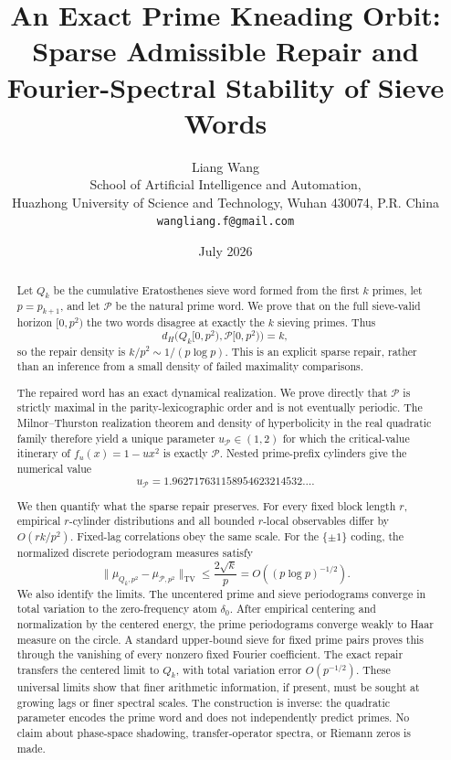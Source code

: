 \documentclass[11pt]{article}
\title{\textbf{An Exact Prime Kneading Orbit:}\\
Sparse Admissible Repair and Fourier-Spectral Stability of Sieve Words}
\author{Liang Wang\\
\small School of Artificial Intelligence and Automation,\\[-0.2em]
\small Huazhong University of Science and Technology, Wuhan 430074, P.R. China\\
\small \texttt{wangliang.f@gmail.com}}
\date{July 2026}
\theoremstyle{definition}
\theoremstyle{remark}
\newcommand{\cP}{\mathcal{P}}
\newcommand{\uP}{u_{\mathcal P}}
\newcommand{\TV}{\mathrm{TV}}
\begin{document}
\maketitle

\begin{abstract}
Let $Q_k$ be the cumulative Eratosthenes sieve word formed from the first $k$ primes, let $p=p_{k+1}$, and let $\cP$ be the natural prime word.  We prove that on the full sieve-valid horizon $[0,p^2)$ the two words disagree at exactly the $k$ sieving primes.  Thus
\[
    d_H\bigl(Q_k[0,p^2),\cP[0,p^2)\bigr)=k,
\]
so the repair density is $k/p^2\sim 1/(p\log p)$.  This is an explicit sparse repair, rather than an inference from a small density of failed maximality comparisons.

The repaired word has an exact dynamical realization.  We prove directly that $\cP$ is strictly maximal in the parity-lexicographic order and is not eventually periodic.  The Milnor--Thurston realization theorem and density of hyperbolicity in the real quadratic family therefore yield a unique parameter $\uP\in(1,2)$ for which the critical-value itinerary of $f_u(x)=1-u x^2$ is exactly $\cP$.  Nested prime-prefix cylinders give the numerical value
\[
    \uP=1.962717631158954623214532\ldots.
\]

We then quantify what the sparse repair preserves.  For every fixed block length $r$, empirical $r$-cylinder distributions and all bounded $r$-local observables differ by $O(rk/p^2)$.  Fixed-lag correlations obey the same scale.  For the $\{\pm1\}$ coding, the normalized discrete periodogram measures satisfy
\[
    \bigl\|\mu_{Q_k,p^2}-\mu_{\cP,p^2}\bigr\|_{\TV}
    \le \frac{2\sqrt{k}}{p}
    =O\!\left((p\log p)^{-1/2}\right).
\]
We also identify the limits.  The uncentered prime and sieve periodograms converge in total variation to the zero-frequency atom $\delta_0$.  After empirical centering and normalization by the centered energy, the prime periodograms converge weakly to Haar measure on the circle.  A standard upper-bound sieve for fixed prime pairs proves this through the vanishing of every nonzero fixed Fourier coefficient.  The exact repair transfers the centered limit to $Q_k$, with total variation error $O(p^{-1/2})$.  These universal limits show that finer arithmetic information, if present, must be sought at growing lags or finer spectral scales.  The construction is inverse: the quadratic parameter encodes the prime word and does not independently predict primes.  No claim about phase-space shadowing, transfer-operator spectra, or Riemann zeros is made.
\end{abstract}
\end{document}
